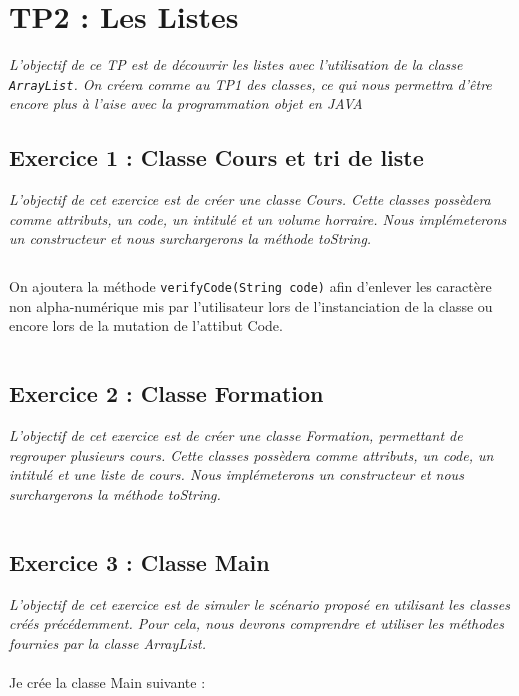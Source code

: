 \chapter{TP2 : Les Listes}
\textit{L'objectif de ce TP est de découvrir les listes avec l'utilisation de la classe \texttt{ArrayList}. On créera comme au TP1 des classes, ce qui nous permettra d'être encore plus à l'aise avec la programmation objet en JAVA}

\section{Exercice 1 : Classe Cours et tri de liste}
\textit{L'objectif de cet exercice est de créer une classe Cours. Cette classes possèdera comme attributs, un code, un intitulé et un volume horraire. Nous implémeterons un constructeur et nous surchargerons la méthode toString.}
\inputminted[linenos,firstline=3,lastline=61]{java}{../sources/src/tp2/Cours.java}

On ajoutera la méthode \texttt{verifyCode(String code)} afin d'enlever les caractère non alpha-numérique mis par l'utilisateur lors de l'instanciation de la classe ou encore lors de la mutation de l'attibut Code.
\inputminted[linenos,firstline=58,lastline=60]{java}{../sources/src/tp2/Cours.java}

\section{Exercice 2 : Classe Formation}
\textit{L'objectif de cet exercice est de créer une classe Formation, permettant de regrouper plusieurs cours. Cette classes possèdera comme attributs, un code, un intitulé et une liste de cours. Nous implémeterons un constructeur et nous surchargerons la méthode toString.}
\inputminted[linenos,firstline=5,lastline=66]{java}{../sources/src/tp2/Formation.java}

\section{Exercice 3 : Classe Main}
\textit{L'objectif de cet exercice est de simuler le scénario proposé en utilisant les classes créés précédemment. Pour cela, nous devrons comprendre et utiliser les méthodes fournies par la classe ArrayList.}
\\\\
Je crée la classe Main suivante :
\inputminted[linenos,firstline=9,lastline=46]{java}{../sources/src/tp2/Main.java}

